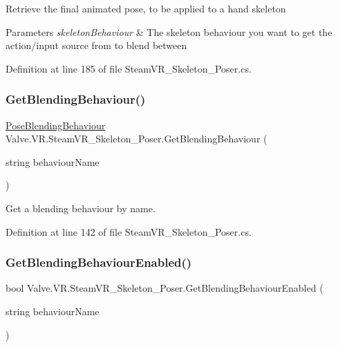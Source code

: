Retrieve the final animated pose, to be applied to a hand skeleton 


\begin{DoxyParams}{Parameters}
{\em skeleton\+Behaviour} & The skeleton behaviour you want to get the action/input source from to blend between\\
\hline
\end{DoxyParams}


Definition at line 185 of file Steam\+V\+R\+\_\+\+Skeleton\+\_\+\+Poser.\+cs.

\mbox{\label{class_valve_1_1_v_r_1_1_steam_v_r___skeleton___poser_a1d908654738a4881221dc68fad3e8f4f}} 
\subsubsection{\texorpdfstring{GetBlendingBehaviour()}{GetBlendingBehaviour()}}
{\footnotesize\ttfamily \mbox{\hyperlink{class_valve_1_1_v_r_1_1_steam_v_r___skeleton___poser_1_1_pose_blending_behaviour}{Pose\+Blending\+Behaviour}} Valve.\+V\+R.\+Steam\+V\+R\+\_\+\+Skeleton\+\_\+\+Poser.\+Get\+Blending\+Behaviour (\begin{DoxyParamCaption}\item[{string}]{behaviour\+Name }\end{DoxyParamCaption})}



Get a blending behaviour by name. 



Definition at line 142 of file Steam\+V\+R\+\_\+\+Skeleton\+\_\+\+Poser.\+cs.

\mbox{\label{class_valve_1_1_v_r_1_1_steam_v_r___skeleton___poser_a450ef2915c0515576353689fad3ad3b7}} 
\subsubsection{\texorpdfstring{GetBlendingBehaviourEnabled()}{GetBlendingBehaviourEnabled()}}
{\footnotesize\ttfamily bool Valve.\+V\+R.\+Steam\+V\+R\+\_\+\+Skeleton\+\_\+\+Poser.\+Get\+Blending\+Behaviour\+Enabled (\begin{DoxyParamCaption}\item[{string}]{behaviour\+Name }\end{DoxyParamCaption})}




